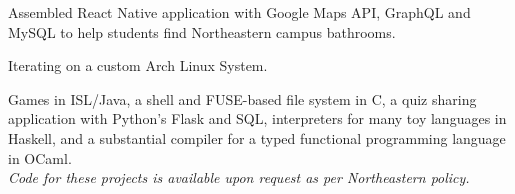 \documentclass[letterpaper]{resume} %
\begin{document}
\begin{minipage}[t]{0.66\textwidth}
Assembled React Native application with Google Maps API,
GraphQL and MySQL to help students find Northeastern campus bathrooms.
\sectionspace

Iterating on a custom Arch Linux System.
\sectionspace

Games in ISL/Java,
a shell and FUSE-based file system in C,
a quiz sharing application with Python's Flask and SQL,
interpreters for many toy languages in Haskell,
and a substantial compiler for a typed functional programming language in OCaml. \\
\textit{Code for these projects is available upon request as per Northeastern policy.}

\end{minipage} %
\end{document}
